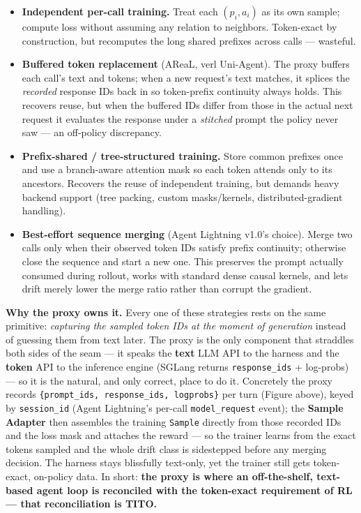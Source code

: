 \documentclass[
  paper=a4,
  ,captions=tableheading
]{scrartcl}
\providecommand{\tightlist}{%
  \setlength{\itemsep}{0pt}\setlength{\parskip}{0pt}}
\begin{document}
\begin{itemize}
\tightlist
\item
  \textbf{Independent per-call training.} Treat each \((p_i,a_i)\) as
  its own sample; compute loss without assuming any relation to
  neighbors. Token-exact by construction, but recomputes the long shared
  prefixes across calls --- wasteful.
\item
  \textbf{Buffered token replacement} (AReaL, verl Uni-Agent). The proxy
  buffers each call's text and tokens; when a new request's text
  matches, it splices the \emph{recorded} response IDs back in so
  token-prefix continuity always holds. This recovers reuse, but when
  the buffered IDs differ from those in the actual next request it
  evaluates the response under a \emph{stitched} prompt the policy never
  saw --- an off-policy discrepancy.
\item
  \textbf{Prefix-shared / tree-structured training.} Store common
  prefixes once and use a branch-aware attention mask so each token
  attends only to its ancestors. Recovers the reuse of independent
  training, but demands heavy backend support (tree packing, custom
  masks/kernels, distributed-gradient handling).
\item
  \textbf{Best-effort sequence merging} (Agent Lightning v1.0's choice).
  Merge two calls only when their observed token IDs satisfy prefix
  continuity; otherwise close the sequence and start a new one. This
  preserves the prompt actually consumed during rollout, works with
  standard dense causal kernels, and lets drift merely lower the merge
  ratio rather than corrupt the gradient.
\end{itemize}

\textbf{Why the proxy owns it.} Every one of these strategies rests on
the same primitive: \emph{capturing the sampled token IDs at the moment
of generation} instead of guessing them from text later. The proxy is
the only component that straddles both sides of the seam --- it speaks
the \textbf{text} LLM API to the harness and the \textbf{token} API to
the inference engine (SGLang returns \texttt{response\_ids} + log-probs)
--- so it is the natural, and only correct, place to do it. Concretely
the proxy records \texttt{\{prompt\_ids,\ response\_ids,\ logprobs\}}
per turn (Figure above), keyed by \texttt{session\_id} (Agent
Lightning's per-call \texttt{model\_request} event); the \textbf{Sample
Adapter} then assembles the training \texttt{Sample} directly from those
recorded IDs and the loss mask and attaches the reward --- so the
trainer learns from the exact tokens sampled and the whole drift class
is sidestepped before any merging decision. The harness stays blissfully
text-only, yet the trainer still gets token-exact, on-policy data. In
short: \textbf{the proxy is where an off-the-shelf, text-based agent
loop is reconciled with the token-exact requirement of RL --- that
reconciliation is TITO.}
\end{document}

